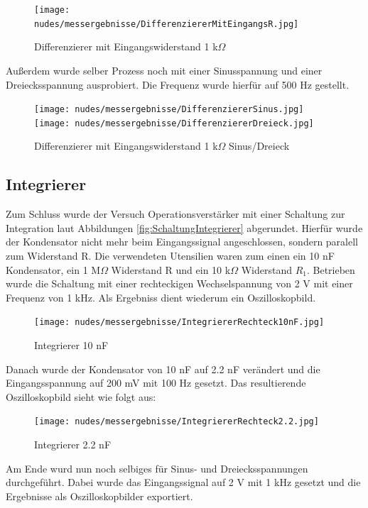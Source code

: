 \documentclass[12pt,a4paper,twoside]{article}
\begin{document}
\begin{figure}[H]
    \centering
    \texttt{[image: nudes/messergebnisse/DifferenziererMitEingangsR.jpg]}
    \caption{Differenzierer mit Eingangswiderstand 1 k$\Omega$}
    \label{fig:Differenzierer1R1}
\end{figure}

\noindent
Außerdem wurde selber Prozess noch mit einer Sinusspannung und einer Dreiecksspannung ausprobiert. Die Frequenz wurde hierfür auf 500 Hz gestellt.

\begin{figure}[H]
    \centering
    \texttt{[image: nudes/messergebnisse/DifferenziererSinus.jpg]}
    \texttt{[image: nudes/messergebnisse/DifferenziererDreieck.jpg]}
    \caption{Differenzierer mit Eingangswiderstand 1 k$\Omega$ Sinus/Dreieck}
    \label{fig:Differenzierer1R1Sinus/Dreieck}
\end{figure}


\subsection{Integrierer}
Zum Schluss wurde der Versuch Operationsverstärker mit einer Schaltung zur Integration laut Abbildungen \ref{fig:SchaltungIntegrierer} abgerundet. Hierfür wurde der Kondensator nicht mehr beim Eingangssignal angeschlossen, sondern paralell zum Widerstand R.
Die verwendeten Utensilien waren zum einen ein 10 nF Kondensator, ein 1 M$\Omega$ Widerstand R und ein 10 k$\Omega$ Widerstand $R_{1}$. Betrieben wurde die Schaltung mit einer rechteckigen Wechselspannung von 2 V mit einer Frequenz von 1 kHz. Als Ergebniss dient wiederum ein Oszilloskopbild.

\begin{figure}[H]
    \centering
    \texttt{[image: nudes/messergebnisse/IntegriererRechteck10nF.jpg]}
    \caption{Integrierer 10 nF}
    \label{fig:IntegriererResultat1}
\end{figure}

\noindent
Danach wurde der Kondensator von 10 nF auf 2.2 nF verändert und die Eingangsspannung auf 200 mV mit 100 Hz gesetzt. Das resultierende Oszilloskopbild sieht wie folgt aus:

\begin{figure}[H]
    \centering
    \texttt{[image: nudes/messergebnisse/IntegriererRechteck2.2.jpg]}
    \caption{Integrierer 2.2 nF}
    \label{fig:IntegriererResultat2}
\end{figure}

\noindent
Am Ende wurd nun noch selbiges für Sinus- und Dreiecksspannungen durchgeführt. Dabei wurde das Eingangssignal auf 2 V mit 1 kHz gesetzt und die Ergebnisse als Oszilloskopbilder exportiert.
\end{document}

